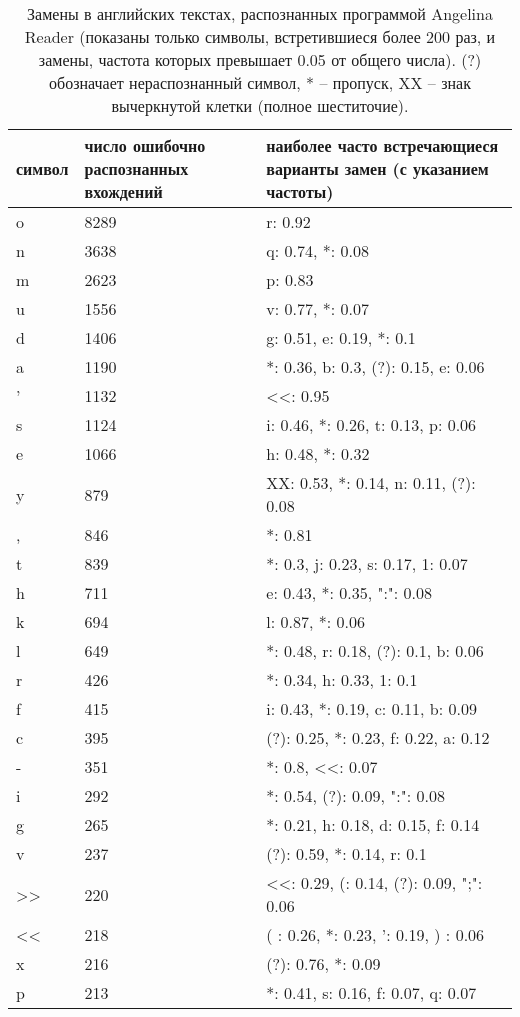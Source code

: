 \documentclass{main.tex}[subfiles]
\begin{document}
\newpage
{}

\begin{table}[H]
    \centering
    \caption{Замены в английских текстах, распознанных программой Angelina Reader (показаны только символы, встретившиеся более 200 раз, и замены, частота которых превышает 0.05 от общего числа). (?) обозначает нераспознанный символ, * -- пропуск, XX -- знак вычеркнутой клетки (полное шеститочие).}
    \begin{tabular}{l p{} p{}}
        \hline
        символ & число ошибочно распознанных вхождений & наиболее часто встречающиеся варианты замен (с указанием частоты) \\
        \hline
        o & 8289 & r: 0.92 \\
        n & 3638 & q: 0.74, *: 0.08 \\
        m & 2623 & p: 0.83 \\
        u & 1556 & v: 0.77, *: 0.07 \\
        d & 1406 & g: 0.51, e: 0.19, *: 0.1 \\
        a & 1190 & *: 0.36, b: 0.3, (?): 0.15, e: 0.06 \\
        ' & 1132 & <<: 0.95 \\
        s & 1124 & i: 0.46, *: 0.26, t: 0.13, p: 0.06 \\
        e & 1066 & h: 0.48, *: 0.32 \\
        y & 879 & XX: 0.53, *: 0.14, n: 0.11, (?): 0.08 \\
        , & 846 & *: 0.81 \\
        t & 839 & *: 0.3, j: 0.23, s: 0.17, 1: 0.07 \\
        h & 711 & e: 0.43, *: 0.35, ":": 0.08 \\
        k & 694 & l: 0.87, *: 0.06 \\
        l & 649 & *: 0.48, r: 0.18, (?): 0.1, b: 0.06 \\
        r & 426 & *: 0.34, h: 0.33, 1: 0.1 \\
        f & 415 & i: 0.43, *: 0.19, c: 0.11, b: 0.09 \\
        c & 395 & (?): 0.25, *: 0.23, f: 0.22, a: 0.12 \\
        - & 351 & *: 0.8, <<: 0.07 \\
        i & 292 & *: 0.54, (?): 0.09, ":": 0.08 \\
        g & 265 & *: 0.21, h: 0.18, d: 0.15, f: 0.14 \\
        v & 237 & (?): 0.59, *: 0.14, r: 0.1 \\
        >> & 220 & <<: 0.29, (: 0.14, (?): 0.09, ";": 0.06 \\
        << & 218 & ( : 0.26, *: 0.23, ': 0.19, ) : 0.06 \\
        x & 216 & (?): 0.76, *: 0.09 \\
        p & 213 & *: 0.41, s: 0.16, f: 0.07, q: 0.07 \\
        \hline
    \end{tabular}
    \label{table:per_letter_errs}
\end{table}
\end{document}
